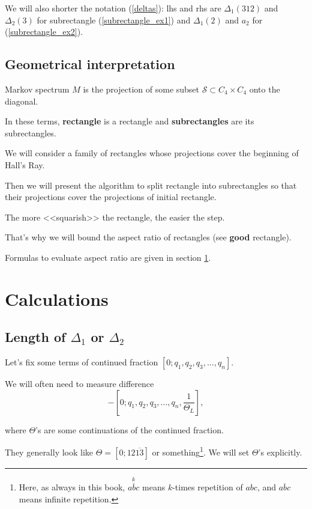 \documentclass[a4paper, 12pt]{article}
\let\oldref\ref
\renewcommand{\ref}[1]{(\oldref{#1})}
\theoremstyle{definition}
\theoremstyle{definition}
\theoremstyle{proposition}
\theoremstyle{lemma}
\newcommand{\D}{\Delta}
\newcommand{\T}{\Theta}
\begin{document}
We will also shorter the notation \ref{deltas}: lhs and rhs are $\D_1(312)$ and $\D_2(3)$ for subrectangle \ref{subrectangle_ex1} and $\D_1(2)$ and $a_2$ for \ref{subrectangle_ex2}.


\subsection{Geometrical interpretation}

Markov spectrum $M$ is the projection of some subset $\mathcal{S} \subset C_4 \times C_4$ onto the diagonal.

In these terms, \textbf{rectangle} is a rectangle and \textbf{subrectangles} are its subrectangles.

We will consider a family of rectangles whose projections cover the beginning of Hall's Ray.

Then we will present the algorithm to split rectangle into subrectangles so that their projections cover the projections of initial rectangle.

The more <<squarish>> the rectangle, the easier the step.

That's why we will bound the aspect ratio of rectangles (see \textbf{good} rectangle).

Formulas to evaluate aspect ratio are given in section \oldref{section_calculations}.

\newpage
\section{Calculations}
\label{section_calculations}

\subsection{Length of $\D_1$ or $\D_2$}
\label{useful_equality}

Let's fix some terms of continued fraction $[0; q_1, q_2, q_3, ..., q_n]$.

We will often need to measure difference
\begin{equation*}
	[0; q_1, q_2, q_3, ..., q_n, \dfrac{1}{\T_R}] - 
	[0; q_1, q_2, q_3, ..., q_n, \dfrac{1}{\T_L}],
\end{equation*}

where $\T$'s are some continuations of the continued fraction.

They generally look like $\T = [0;12\overline{13}]$ or something\footnote{%
	Here, as always in this book, $\overset{k}{\overline{abc}}$
	means $k$-times repetition of $abc$,
	and $\overline{abc}$ means infinite repetition.}.
We will set $\T$'s explicitly.
\end{document}
